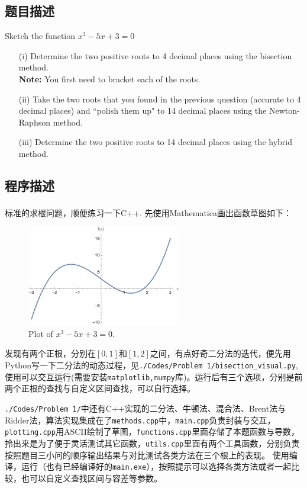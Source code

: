 \subsection{题目描述}
Sketch the function \boldmath\(x^3 - 5x + 3 = 0\)\unboldmath
\begin{enumerate}
    \item[(i)] Determine the two positive roots to 4 decimal places using the bisection method.\\
          \textbf{Note:} You first need to bracket each of the roots.

    \item[(ii)] Take the two roots that you found in the previous question (accurate to 4 decimal places) and ``polish them up" to 14 decimal places using the Newton-Raphson method.

    \item[(iii)] Determine the two positive roots to 14 decimal places using the hybrid method.
\end{enumerate}

\subsection{程序描述}
标准的求根问题，顺便练习一下C++. 先使用Mathematica\textsuperscript{\textregistered}画出函数草图如下：
\begin{figure}[H]
    \centering
    \includegraphics[width=0.6\textwidth]{./Figs/1_plot.pdf}  %
    \caption{Plot of $x^3 - 5x + 3 = 0$.}
\end{figure}
\noindent 发现有两个正根，分别在$[0, 1]$和$[1, 2]$之间，有点好奇二分法的迭代，便先用Python写一下二分法的动态过程，见\texttt{./Codes/Problem 1/bisection\_visual.py},
使用可以交互运行(需要安装\texttt{matplotlib,numpy}库)。运行后有三个选项，分别是前两个正根的查找与自定义区间查找，可以自行选择。

\texttt{./Codes/Problem 1/}中还有C++实现的二分法、牛顿法、混合法、Brent法与Ridder法，算法实现集成在了\texttt{methods.cpp}中，\texttt{main.cpp}负责封装与交互，\texttt{plotting.cpp}用ASCII绘制了草图，\texttt{functions.cpp}里面存储了本题函数与导数，拎出来是为了便于灵活测试其它函数，\texttt{utils.cpp}里面有两个工具函数，分别负责按照题目三小问的顺序输出结果与对比测试各类方法在三个根上的表现。
使用编译，运行（也有已经编译好的\texttt{main.exe}），按照提示可以选择各类方法或者一起比较，也可以自定义查找区间与容差等参数。

